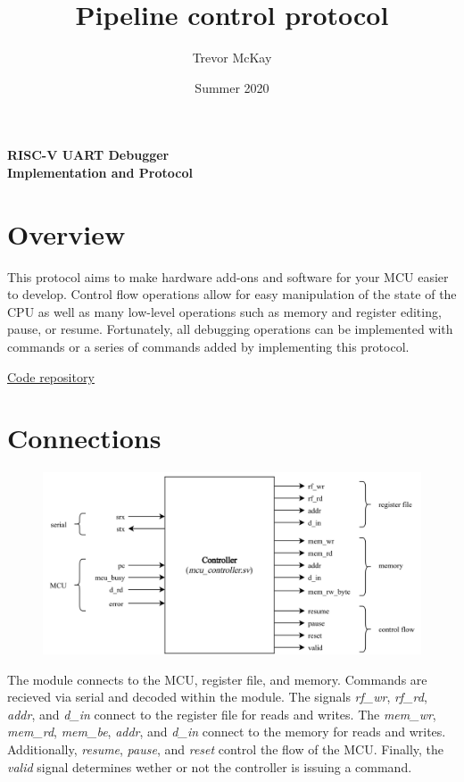 \documentclass[10pt,a4paper]{article}
\title{Pipeline control protocol}
\author{Trevor McKay}
\date{Summer 2020}
\begin{document}
\begin{center}
    \Large\textbf{RISC-V UART Debugger\\Implementation and Protocol}
\end{center}

\section{Overview}

This protocol aims to make hardware add-ons and software for your MCU easier to develop. Control flow operations
allow for easy manipulation of the state of the CPU as well as many low-level operations such
as memory and register editing, pause, or resume. Fortunately, all debugging operations can be
implemented with commands or a series of commands added by implementing this
protocol.

\medskip
\noindent\underline{\href{https://github.com/trmckay/riscv-uart-debugger}{Code repository}}

\section{Connections}

\begin{figure}[H]
    \includegraphics[width=\textwidth]{blackbox}
\end{figure}
\medskip

The module connects to the MCU, register file, and memory. Commands are recieved via serial
and decoded within the module. The signals \emph{rf\_wr}, \emph{rf\_rd}, \emph{addr}, and
\emph{d\_in} connect to the register file for reads and writes. The \emph{mem\_wr},
\emph{mem\_rd}, \emph{mem\_be}, \emph{addr}, and \emph{d\_in} connect to the memory
for reads and writes. Additionally, \emph{resume}, \emph{pause}, and \emph{reset} control
the flow of the MCU\@. Finally, the \emph{valid} signal determines wether or not the controller
is issuing a command.
\end{document}
